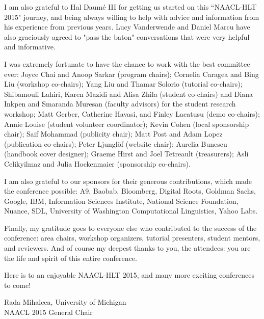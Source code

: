 I am also grateful to Hal Daumé III for getting us started on this ``NAACL-HLT 2015" journey, and being always willing to help with advice and information from his experience from previous years. Lucy Vanderwende and Daniel Marcu have also graciously agreed to "pass the baton" conversations that were very helpful and informative. 

I was extremely fortunate to have the chance to work with the best committee ever: Joyce Chai and Anoop Sarkar (program chairs); Cornelia Caragea and Bing Liu (workshop co-chairs); Yang Liu and Thamar Solorio (tutorial co-chairs); Shibamouli Lahiri, Karen Mazidi and Alisa Zhila (student co-chairs) and Diana Inkpen and Smaranda Muresan (faculty advisors) for the student research workshop; Matt Gerber, Catherine Havasi, and Finley Lacatusu (demo co-chairs); Annie Louise (student volunteer coordinator); Kevin Cohen (local sponsorship chair); Saif Mohammad (publicity chair); Matt Post and Adam Lopez (publication co-chairs); Peter Ljungl\"{o}f (website chair); Aurelia Bunescu (handbook cover designer); Graeme Hirst and Joel Tetreault (treasurers); Asli Celikyilmaz and Julia Hockenmaier (sponsorship co-chairs). 

I am also grateful to our sponsors for their generous contributions, which made the conference possible: A9,  Baobab, Bloomberg,  Digital Roots, Goldman Sachs,  Google, IBM,  Information Sciences Institute, National Science Foundation, Nuance, SDL, University of Washington Computational Linguistics, Yahoo Labs.

Finally, my gratitude goes to everyone else who contributed to the success of the conference: area chairs, workshop organizers, tutorial presenters, student mentors, and reviewers. And of course my deepest thanks to you, the attendees: you are the life and spirit of this entire conference. 

Here is to an enjoyable NAACL-HLT 2015, and many more exciting conferences to come!

\vskip 0.5in
\noindent Rada Mihalcea, University of Michigan\\
NAACL 2015 General Chair

